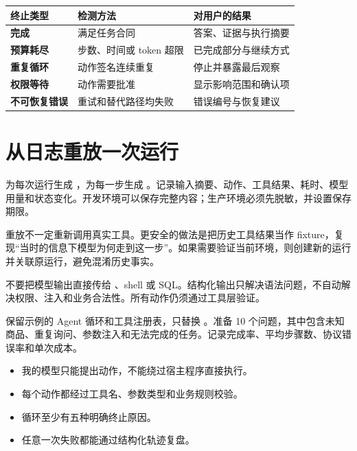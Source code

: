 \begin{table}[htbp]
\centering
\begin{tabularx}{\textwidth}{>{\bfseries}p{} X X}
\toprule
终止类型 & 检测方法 & 对用户的结果 \\
\midrule
完成 & 满足任务合同 & 答案、证据与执行摘要 \\
预算耗尽 & 步数、时间或 token 超限 & 已完成部分与继续方式 \\
重复循环 & 动作签名连续重复 & 停止并暴露最后观察 \\
权限等待 & 动作需要批准 & 显示影响范围和确认项 \\
不可恢复错误 & 重试和替代路径均失败 & 错误编号与恢复建议 \\
\bottomrule
\end{tabularx}
\end{table}

\section{从日志重放一次运行}

为每次运行生成 ，为每一步生成 。记录输入摘要、动作、工具结果、耗时、模型用量和状态变化。开发环境可以保存完整内容；生产环境必须先脱敏，并设置保存期限。

重放不一定重新调用真实工具。更安全的做法是把历史工具结果当作 fixture，复现“当时的信息下模型为何走到这一步”。如果需要验证当前环境，则创建新的运行并关联原运行，避免混淆历史事实。

\begin{warningbox}
不要把模型输出直接传给 、shell 或 SQL。结构化输出只解决语法问题，不自动解决权限、注入和业务合法性。所有动作仍须通过工具层验证。
\end{warningbox}

\begin{practice}[把模拟模型换成真实模型]
保留示例的 Agent 循环和工具注册表，只替换 。准备 10 个问题，其中包含未知商品、重复询问、参数注入和无法完成的任务。记录完成率、平均步骤数、协议错误率和单次成本。
\end{practice}

\begin{checkpoint}
\begin{itemize}
  \item \checkbox 我的模型只能提出动作，不能绕过宿主程序直接执行。
  \item \checkbox 每个动作都经过工具名、参数类型和业务规则校验。
  \item \checkbox 循环至少有五种明确终止原因。
  \item \checkbox 任意一次失败都能通过结构化轨迹复盘。
\end{itemize}
\end{checkpoint}

